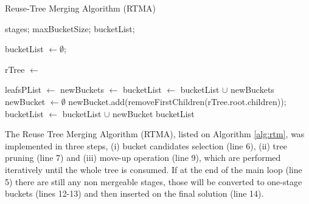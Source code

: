 \begin{algorithm}
\footnotesize
	\caption{Reuse-Tree Merging Algorithm (RTMA)\label{alg:rtm}}

	\begin{algorithmic}[1]
	 stages; maxBucketSize;
	 bucketList;

	\State bucketList $\gets \emptyset$; 

	\State rTree $\gets$ 

		\State leafsPList $\gets$ 
		\State newBuckets $\gets$ 
		\State bucketList $\gets$ bucketList $\cup$ newBuckets
		\State {}
	\EndWhile
		\State newBucket $\gets \emptyset$
		\State newBucket.add(removeFirstChildren(rTree.root.children));
		\State bucketList $\gets$ bucketList $\cup$ newBucket
	\EndWhile
	\State \Return bucketList

	\end{algorithmic}
\end{algorithm}

The Reuse Tree Merging Algorithm (RTMA), listed on Algorithm \ref{alg:rtm}, was implemented in three steps, (i) bucket candidates selection (line 6), (ii) tree pruning (line 7) and (iii) move-up operation (line 9), which are performed iteratively until the whole tree is consumed. If at the end of the main loop (line 5) there are still any non mergeable stages, those will be converted to one-stage buckets (lines 12-13) and then inserted on the final solution (line 14).







